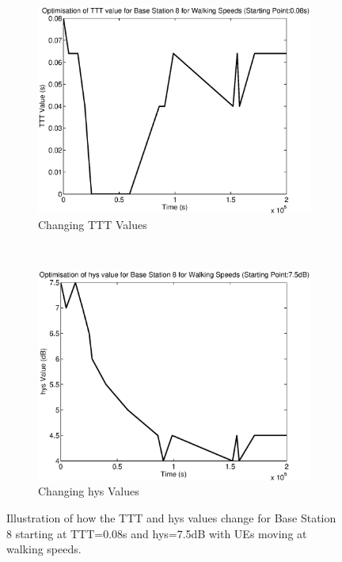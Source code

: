 \begin{figure}[H]
        \centering
        \begin{subfigure}[b]{0.49\textwidth}
                \includegraphics[width=\textwidth]{figures/graphs/walkhighhys/TTT8.eps}
                \caption{Changing TTT Values}
        \end{subfigure}%
        ~ %
        \begin{subfigure}[b]{0.49\textwidth}
                \includegraphics[width=\textwidth]{figures/graphs/walkhighhys/hys8.eps}
                \caption{Changing hys Values}
        \end{subfigure}
        \caption{Illustration of how the TTT and hys values change for Base Station 8 starting at TTT=0.08s and hys=7.5dB with UEs moving at walking speeds.}
\end{figure}
